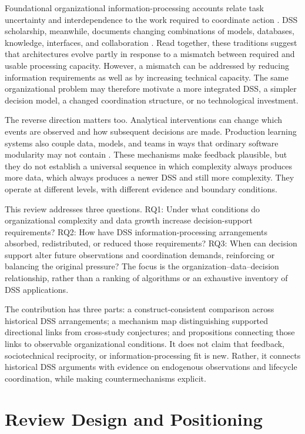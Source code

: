 \documentclass[journal]{IEEEtran}
\begin{document}
Foundational organizational information-processing accounts relate task uncertainty and interdependence to the work required to coordinate action \cite{GALBRAITH1974,TUSHMAN1978}. DSS scholarship, meanwhile, documents changing combinations of models, databases, knowledge, interfaces, and collaboration \cite{shim2002,power2004}. Read together, these traditions suggest that architectures evolve partly in response to a mismatch between required and usable processing capacity. However, a mismatch can be addressed by reducing information requirements as well as by increasing technical capacity. The same organizational problem may therefore motivate a more integrated DSS, a simpler decision model, a changed coordination structure, or no technological investment.

The reverse direction matters too. Analytical interventions can change which events are observed and how subsequent decisions are made. Production learning systems also couple data, models, and teams in ways that ordinary software modularity may not contain \cite{perdomo2020,amershi2019}. These mechanisms make feedback plausible, but they do not establish a universal sequence in which complexity always produces more data, which always produces a newer DSS and still more complexity. They operate at different levels, with different evidence and boundary conditions.

This review addresses three questions. RQ1: Under what conditions do organizational complexity and data growth increase decision-support requirements? RQ2: How have DSS information-processing arrangements absorbed, redistributed, or reduced those requirements? RQ3: When can decision support alter future observations and coordination demands, reinforcing or balancing the original pressure? The focus is the organization--data--decision relationship, rather than a ranking of algorithms or an exhaustive inventory of DSS applications.

The contribution has three parts: a construct-consistent comparison across historical DSS arrangements; a mechanism map distinguishing supported directional links from cross-study conjectures; and propositions connecting those links to observable organizational conditions. It does not claim that feedback, sociotechnical reciprocity, or information-processing fit is new. Rather, it connects historical DSS arguments with evidence on endogenous observations and lifecycle coordination, while making countermechanisms explicit.

\section{Review Design and Positioning}
\end{document}
